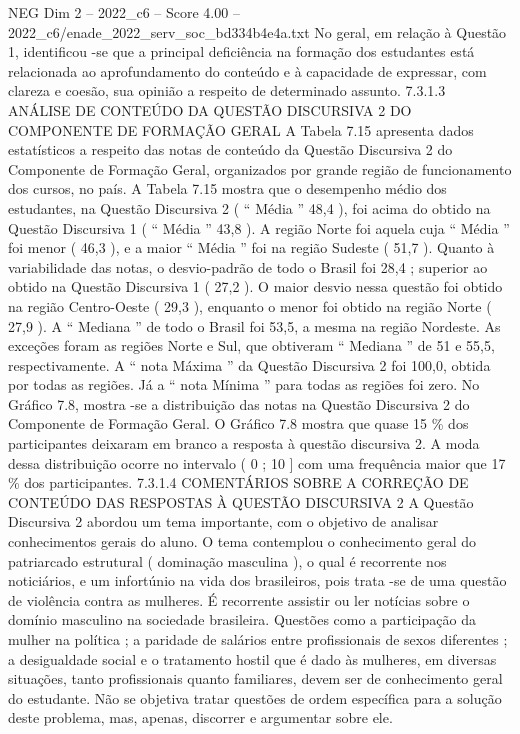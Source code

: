\begin{textsample}{NEG Dim 2 – 2022\_c6 – Score 4.00 – 2022\_c6/enade\_2022\_serv\_soc\_bd334b4e4a.txt}
No geral, em relação à Questão 1, identificou -se que a principal deficiência na formação dos estudantes está relacionada ao aprofundamento do conteúdo e à capacidade de expressar, com clareza e coesão, sua opinião a respeito de determinado assunto. 7.3.1.3 ANÁLISE DE CONTEÚDO DA QUESTÃO DISCURSIVA 2 DO COMPONENTE DE FORMAÇÃO GERAL A Tabela 7.15 apresenta dados estatísticos a respeito das notas de conteúdo da Questão Discursiva 2 do Componente de Formação Geral, organizados por grande região de funcionamento dos cursos, no país.
A Tabela 7.15 mostra que o desempenho médio dos estudantes, na Questão Discursiva 2 ( “ Média ” 48,4 ), foi acima do obtido na Questão Discursiva 1 ( “ Média ” 43,8 ).
A região Norte foi aquela cuja “ Média ” foi menor ( 46,3 ), e a maior “ Média ” foi na região Sudeste ( 51,7 ).
Quanto à variabilidade das notas, o desvio-padrão de todo o Brasil foi 28,4 ; superior ao obtido na Questão Discursiva 1 ( 27,2 ).
O maior desvio nessa questão foi obtido na região Centro-Oeste ( 29,3 ), enquanto o menor foi obtido na região Norte ( 27,9 ).
A “ Mediana ” de todo o Brasil foi 53,5, a mesma na região Nordeste.
As exceções foram as regiões Norte e Sul, que obtiveram “ Mediana ” de 51 e 55,5, respectivamente.
A “ nota Máxima ” da Questão Discursiva 2 foi 100,0, obtida por todas as regiões.
Já a “ nota Mínima ” para todas as regiões foi zero.
No Gráfico 7.8, mostra -se a distribuição das notas na Questão Discursiva 2 do Componente de Formação Geral.
O Gráfico 7.8 mostra que quase 15 \% dos participantes deixaram em branco a resposta à questão discursiva 2.
A moda dessa distribuição ocorre no intervalo ( 0 ; 10 ] com uma frequência maior que 17 \% dos participantes. 7.3.1.4 COMENTÁRIOS SOBRE A CORREÇÃO DE CONTEÚDO DAS RESPOSTAS À QUESTÃO DISCURSIVA 2 A Questão Discursiva 2 abordou um tema importante, com o objetivo de analisar conhecimentos gerais do aluno.
O tema contemplou o conhecimento geral do patriarcado estrutural ( dominação masculina ), o qual é recorrente nos noticiários, e um infortúnio na vida dos brasileiros, pois trata -se de uma questão de violência contra as mulheres.
É recorrente assistir ou ler notícias sobre o domínio masculino na sociedade brasileira.
Questões como a participação da mulher na política ; a paridade de salários entre profissionais de sexos diferentes ; a desigualdade social e o tratamento hostil que é dado às mulheres, em diversas situações, tanto profissionais quanto familiares, devem ser de conhecimento geral do estudante.
Não se objetiva tratar questões de ordem específica para a solução deste problema, mas, apenas, discorrer e argumentar sobre ele.

\end{textsample}
